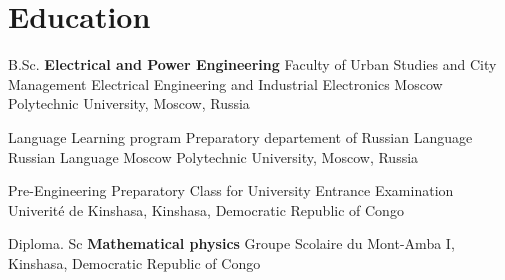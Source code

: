 \section{Education}
        \cventry{}
                {B.Sc. \textbf{Electrical and Power Engineering}}
                {Faculty of Urban Studies and City Management}
                {Electrical Engineering and Industrial Electronics}
                {Moscow Polytechnic University, Moscow, Russia}{}
        
        \vspace{10pt}    

        \cventry{}
                {Language Learning program }
                {Preparatory departement of Russian Language}
                {Russian Language}
                {}{Moscow Polytechnic University, Moscow, Russia}
        
        \vspace{10pt}
        
        \cventry{}
                {Pre-Engineering}
                {Preparatory Class for University Entrance Examination}
                {}{}{Univerité de Kinshasa, Kinshasa, Democratic Republic of Congo}
                
        \vspace{10pt}     

        \cventry{}
                {Diploma. Sc \textbf{Mathematical physics}}
                {}
                {}{}{Groupe Scolaire du Mont-Amba I, Kinshasa, Democratic Republic of Congo}